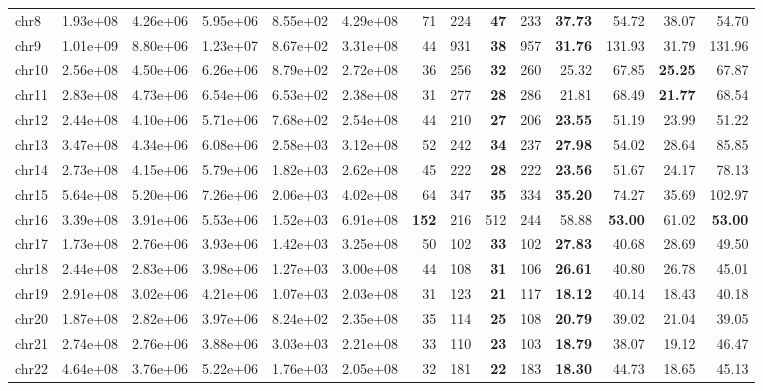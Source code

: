 \begin{table*}[!ht]
\begin{tabular}{@{}lrrrrrrrrrrrrr@{}}
		chr8 & 1.93e+08 & 4.26e+06 & 5.95e+06 & 8.55e+02 & 4.29e+08 & 71 & 224 & \textbf{47} & 233 & \textbf{37.73} & 54.72 & 38.07 & 54.70 \\ 
		chr9 & 1.01e+09 & 8.80e+06 & 1.23e+07 & 8.67e+02 & 3.31e+08 & 44 & 931 & \textbf{38} & 957 & \textbf{31.76} & 131.93 & 31.79 & 131.96 \\ 
		chr10 & 2.56e+08 & 4.50e+06 & 6.26e+06 & 8.79e+02 & 2.72e+08 & 36 & 256 & \textbf{32} & 260 & 25.32 & 67.85 & \textbf{25.25} & 67.87 \\ 
		chr11 & 2.83e+08 & 4.73e+06 & 6.54e+06 & 6.53e+02 & 2.38e+08 & 31 & 277 & \textbf{28} & 286 & 21.81 & 68.49 & \textbf{21.77} & 68.54 \\ 
		chr12 & 2.44e+08 & 4.10e+06 & 5.71e+06 & 7.68e+02 & 2.54e+08 & 44 & 210 & \textbf{27} & 206 & \textbf{23.55} & 51.19 & 23.99 & 51.22 \\ 
		chr13 & 3.47e+08 & 4.34e+06 & 6.08e+06 & 2.58e+03 & 3.12e+08 & 52 & 242 & \textbf{34} & 237 & \textbf{27.98} & 54.02 & 28.64 & 85.85 \\ 
		chr14 & 2.73e+08 & 4.15e+06 & 5.79e+06 & 1.82e+03 & 2.62e+08 & 45 & 222 & \textbf{28} & 222 & \textbf{23.56} & 51.67 & 24.17 & 78.13 \\ 
		chr15 & 5.64e+08 & 5.20e+06 & 7.26e+06 & 2.06e+03 & 4.02e+08 & 64 & 347 & \textbf{35} & 334 & \textbf{35.20} & 74.27 & 35.69 & 102.97 \\ 
		chr16 & 3.39e+08 & 3.91e+06 & 5.53e+06 & 1.52e+03 & 6.91e+08 & \textbf{152} & 216 & 512 & 244 & 58.88 & \textbf{53.00} & 61.02 & \textbf{53.00} \\ 
		chr17 & 1.73e+08 & 2.76e+06 & 3.93e+06 & 1.42e+03 & 3.25e+08 & 50 & 102 & \textbf{33} & 102 & \textbf{27.83} & 40.68 & 28.69 & 49.50 \\ 
		chr18 & 2.44e+08 & 2.83e+06 & 3.98e+06 & 1.27e+03 & 3.00e+08 & 44 & 108 & \textbf{31} & 106 & \textbf{26.61} & 40.80 & 26.78 & 45.01 \\ 
		chr19 & 2.91e+08 & 3.02e+06 & 4.21e+06 & 1.07e+03 & 2.03e+08 & 31 & 123 & \textbf{21} & 117 & \textbf{18.12} & 40.14 & 18.43 & 40.18 \\ 
		chr20 & 1.87e+08 & 2.82e+06 & 3.97e+06 & 8.24e+02 & 2.35e+08 & 35 & 114 & \textbf{25} & 108 & \textbf{20.79} & 39.02 & 21.04 & 39.05 \\ 
		chr21 & 2.74e+08 & 2.76e+06 & 3.88e+06 & 3.03e+03 & 2.21e+08 & 33 & 110 & \textbf{23} & 103 & \textbf{18.79} & 38.07 & 19.12 & 46.47 \\ 
		chr22 & 4.64e+08 & 3.76e+06 & 5.22e+06 & 1.76e+03 & 2.05e+08 & 32 & 181 & \textbf{22} & 183 & \textbf{18.30} & 44.73 & 18.65 & 45.13 \\ 

\end{tabular}
\end{table*}
